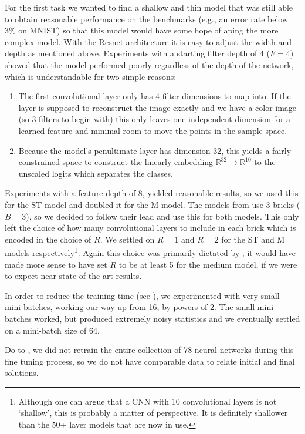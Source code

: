 \documentclass[english,a4paper,oneside]{amsart}
\theoremstyle{definition}
\begin{document}
For the first task we wanted to find a shallow and thin model that was still able to obtain reasonable performance on the benchmarks (e.g., an error rate below 3\% on MNIST) so that this model would have some hope of aping the more complex model. With the Resnet architecture it is easy to adjust the width and depth as mentioned above. Experiments with a starting filter depth of 4 ($F=4$) showed that the model performed poorly regardless of the depth of the network, which is understandable for two simple reasons:
\begin{enumerate}
	\item The first convolutional layer only has 4 filter dimensions to map into. If the layer is supposed to reconstruct the image exactly and we have a color image (so 3 filters to begin with) this only leaves one independent dimension for a learned feature and minimal room to move the points in the sample space. 
	\item Because the model's penultimate layer has dimension 32, this yields a fairly constrained space to construct the linearly embedding $\mathbb{R}^{32}\to \mathbb{R}^{10}$ to the unscaled logits which separates the classes. 
\end{enumerate}
Experiments with a feature depth of 8, yielded reasonable results, so we used this for the ST model and doubled it for the M model. The models from \cite{ResNet} use 3 bricks ($B=3$), so we decided to follow their lead and use this for both models. This only left the choice of how many convolutional layers to include in each brick which is encoded in the choice of $R$. We settled on $R=1$ and $R=2$ for the ST and M models respectively\footnote{Although one can argue that a CNN with 10 convolutional layers is not `shallow', this is probably a matter of perspective. It is definitely shallower than the 50+ layer models that are now in use.}. Again this choice was primarily dictated by ; it would have made more sense to have set $R$ to be at least 5 for the medium model, if we were to expect near state of the art results. 

In order to reduce the training time (see ), we experimented with very small mini-batches, working our way up from 16, by powers of 2. The small mini-batches worked, but produced extremely noisy statistics and we eventually settled on a mini-batch size of 64. 

Do to , we did not retrain the entire collection of 78 neural networks during this fine tuning process, so we do not have comparable data to relate initial and final solutions. 
\end{document}
